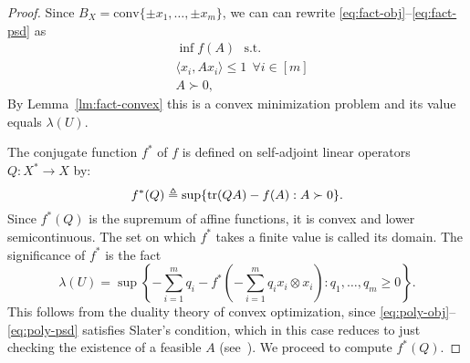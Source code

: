 \dual*
\begin{proof}%
  Since $B_X = \mathrm{conv}\{\pm x_1, \ldots, \pm x_m\}$, we can can
  rewrite \eqref{eq:fact-obj}--\eqref{eq:fact-psd} as
  \begin{align}
    &\inf f(A)\ \ \ 
    \text{s.t.}\label{eq:poly-obj}\\
    &\langle x_i, Ax_i\rangle \le 1 \ \ \forall i \in [m]\\
    &A \succ 0\label{eq:poly-psd},
  \end{align}
  By Lemma~\ref{lm:fact-convex} this is a convex minimization problem
  and its value equals $\lambda(U)$.

  The conjugate function $f^*$ of $f$ is defined on self-adjoint
  linear operators $Q:X^* \to X$ by:
  \[
  f^*(Q) \triangleq \sup\{\operatorname{tr}(QA) - f(A): A \succ 0\}.
  \]
  Since $f^*(Q)$ is the supremum of affine functions, it is convex and
  lower semicontinuous. The set on which $f^*$ takes a finite value is
  called its domain. The significance of $f^*$ is the fact
  \begin{equation}\label{eq:lagrange}
  \lambda(U) = 
  \sup\left\{-\sum_{i = 1}^m{q_i} - 
    f^*\left(-\sum_{i = 1}^m{q_i x_i\otimes x_i}\right):
      q_1, \ldots, q_m \ge 0\right\}.
  \end{equation}
  This follows from the duality theory of convex optimization, since
  \eqref{eq:poly-obj}--\eqref{eq:poly-psd} satisfies Slater's
  condition, which in this case reduces to just checking the existence
  of a feasible $A$ (see~\cite[Chapter 5]{BoydV04}). We proceed to
  compute $f^*(Q)$.


\end{proof}
